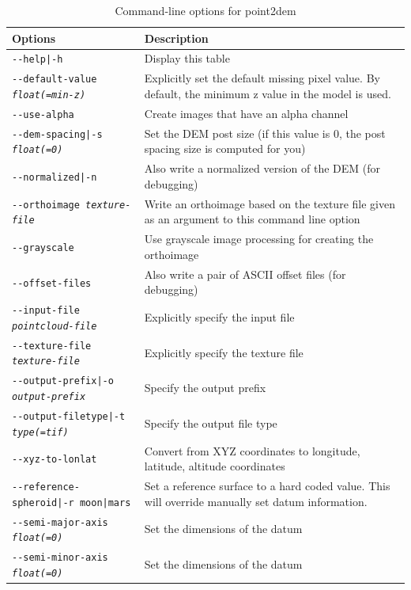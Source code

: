 \begin{longtable}{|l|p{10cm}|}
\caption{Command-line options for point2dem}
\label{tbl:point2dem}
\endfirsthead
\endhead
\endfoot
\endlastfoot
\hline
Options & Description \\ \hline \hline
\texttt{-\/-help|-h} & Display this table \\ \hline
\texttt{-\/-default-value \textit{float(=min-z)}} & Explicitly set the default missing pixel value. By default, the minimum z value in the model is used. \\ \hline
\texttt{-\/-use-alpha} & Create images that have an alpha channel \\ \hline
\texttt{-\/-dem-spacing|-s \textit{float(=0)}} & Set the \ac{DEM} post size (if this value is 0, the post spacing size is computed for you) \\ \hline
\texttt{-\/-normalized|-n} & Also write a normalized version of the \ac{DEM} (for debugging) \\ \hline
\texttt{-\/-orthoimage \textit{texture-file}} & Write an orthoimage based on the texture file given as an argument to this command line option \\ \hline
\texttt{-\/-grayscale} & Use grayscale image processing for creating the orthoimage \\ \hline
\texttt{-\/-offset-files} & Also write a pair of ASCII offset files (for debugging) \\ \hline
\texttt{-\/-input-file \textit{pointcloud-file}} & Explicitly specify the input file \\ \hline
\texttt{-\/-texture-file \textit{texture-file}} & Explicitly specify the texture file \\ \hline
\texttt{-\/-output-prefix|-o \textit{output-prefix}} & Specify the output prefix \\ \hline
\texttt{-\/-output-filetype|-t \textit{type(=tif)}} & Specify the output file type \\ \hline
\texttt{-\/-xyz-to-lonlat} & Convert from XYZ coordinates to longitude, latitude, altitude coordinates \\ \hline
\texttt{-\/-reference-spheroid|-r moon|mars} & Set a reference surface to a hard coded value. This will override manually set datum information. \\ \hline
\texttt{-\/-semi-major-axis \textit{float(=0)}} & Set the dimensions of the datum \\ \hline
\texttt{-\/-semi-minor-axis \textit{float(=0)}} & Set the dimensions of the datum \\ \hline

\end{longtable}
